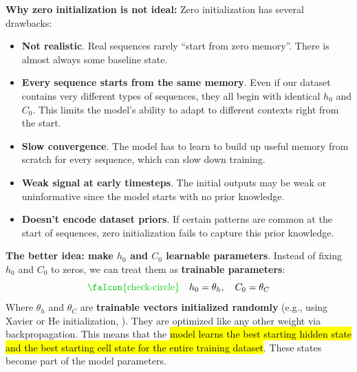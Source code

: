 \highspace
\textcolor{Red2}{ \textbf{Why zero initialization is not ideal:}} Zero initialization has several drawbacks:
\begin{itemize}
    \item[\textcolor{Red2}{\faIcon{times}}] \textbf{Not realistic}. Real sequences rarely ``start from zero memory''. There is almost always some baseline state.
    \item[\textcolor{Red2}{\faIcon{times}}] \textbf{Every sequence starts from the same memory}. Even if our dataset contains very different types of sequences, they all begin with identical $h_0$ and $C_0$. This limits the model's ability to adapt to different contexts right from the start.
    \item[\textcolor{Red2}{\faIcon{times}}] \textbf{Slow convergence}. The model has to learn to build up useful memory from scratch for every sequence, which can slow down training.
    \item[\textcolor{Red2}{\faIcon{times}}] \textbf{Weak signal at early timesteps}. The initial outputs may be weak or uninformative since the model starts with no prior knowledge.
    \item[\textcolor{Red2}{\faIcon{times}}] \textbf{Doesn't encode dataset priors}. If certain patterns are common at the start of sequences, zero initialization fails to capture this prior knowledge.
\end{itemize}

\highspace
\textcolor{Green3}{ \textbf{The better idea: make $h_0$ and $C_0$ learnable parameters}}. Instead of fixing $h_0$ and $C_0$ to zeros, we can treat them as \textbf{trainable parameters}:
\begin{equation*}
    \textcolor{Green3}{\text{\faIcon{check-circle}}} \quad h_0 = \theta_h, \quad C_0 = \theta_C
\end{equation*}
Where $\theta_h$ and $\theta_C$ are \textbf{trainable vectors initialized randomly} (e.g., using Xavier or He initialization, ). They are optimized like any other weight via backpropagation. This means that the \hl{model learns the best starting hidden state and the best starting cell state for the entire training dataset}. These states become part of the model parameters.

\newpage

